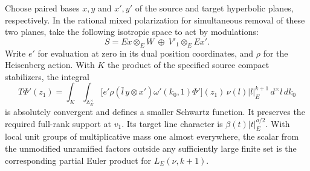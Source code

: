 \begin{lemma}
\label{tpd:mellin}
Choose paired bases \(x,y\) and \(x',y'\) of the source and target
hyperbolic planes, respectively. In the rational mixed polarization
for simultaneous removal of these two planes, take the following
isotropic space to act by modulations:
\[
 S=Ex\otimes_E W\ \oplus\ V'_1\otimes_E Ex'.
\]
Write \(e'\) for evaluation at zero in its dual position coordinates,
and \(\rho\) for the Heisenberg action. With \(K\) the product of the
specified source compact stabilizers, the integral
\[
 T\Phi'(z_1)=\int_K\int_{\mathbb A_E^\times}
   \big[e'\rho(\bar l\, y\otimes x')\omega'(k_0,1)\Phi'\big](z_1)
           \,\nu(l)|l|_E^{k+1}\,d^\times l\,dk_0
\]
is absolutely convergent and defines a smaller Schwartz function.
It preserves the required full-rank support at \(v_1\).
Its target line character is \(\beta(t)|t|_E^{a/2}\).
With local unit groups of multiplicative mass one almost everywhere,
the scalar from the unmodified unramified factors outside any
sufficiently large finite set is the corresponding partial Euler
product for \(L_E(\nu,k+1)\).
\end{lemma}
